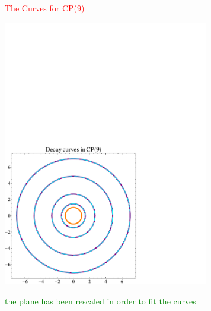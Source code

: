 \documentclass[12pt,letterpaper,landscape,KOMA,smallheadings,calcdimensions,display]{powersem}
\begin{document}
\begin{slide}

\centerline{\textcolor{red}{\Large The Curves for CP(9)}}

\vspace{-4.5cm}
\begin{center}
\hspace{2.5cm}
\includegraphics[width=9.0cm]{ccp9.pdf}
\end{center}

\centerline{\textcolor{green}{\small the plane has been rescaled in order to fit the curves}}

\end{slide}
\end{document}
